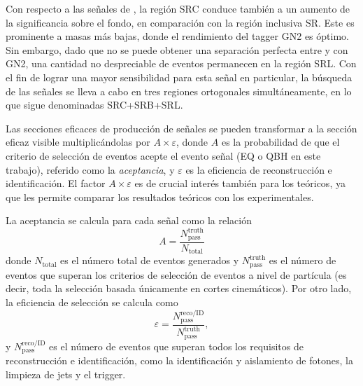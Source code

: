 Con respecto a las señales de \cstar, la región SRC conduce también a un aumento de la significancia sobre el fondo, en comparación con la región inclusiva SR. Este es prominente a masas más bajas, donde el rendimiento del tagger GN2 es óptimo.
Sin embargo, dado que no se puede obtener una separación perfecta entre \cquarks y \lquarks con GN2, una cantidad no despreciable de eventos \cstar permanecen en la región \ltagged SRL. Con el fin de lograr una mayor sensibilidad para esta señal en particular, la búsqueda de las señales \cstar se lleva a cabo en tres regiones ortogonales simultáneamente, en lo que sigue denominadas SRC+SRB+SRL.


Las secciones eficaces de producción de señales se pueden transformar a la sección eficaz visible multiplicándolas por \(A \times \varepsilon\), donde \(A\) es la probabilidad de que el criterio de selección de eventos acepte el evento señal (\ac{EQ} o \ac{QBH} en este trabajo), referido como la \textit{aceptancia}, y \(\varepsilon\) es la eficiencia de reconstrucción e identificación. El factor \(A \times \varepsilon\) es de crucial interés también para los teóricos, ya que les permite comparar los resultados teóricos con los experimentales.

La aceptancia se calcula para cada señal como la relación
\begin{equation}
    A = \frac{N^{\text{truth}}_{\text{pass}}}{N_{\text{total}}}
\end{equation}
donde \(N_{\text{total}}\) es el número total de eventos generados y \(N^{\text{truth}}_{\text{pass}}\) es el número de eventos que superan los criterios de selección de eventos a nivel de partícula (es decir, toda la selección basada únicamente en cortes cinemáticos). Por otro lado, la eficiencia de selección se calcula como
\begin{equation}
    \varepsilon = \frac{N^{\text{reco/ID}}_{\text{pass}}}{N^{\text{truth}}_{\text{pass}}},
\end{equation}
y \(N^{\text{reco/ID}}_{\text{pass}}\) es el número de eventos que superan todos los requisitos de reconstrucción e identificación, como la identificación y aislamiento de fotones, la limpieza de jets y el trigger. %

